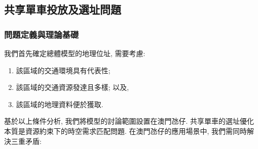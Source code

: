 \subsection{共享單車投放及選址問題}
\subsubsection{問題定義與理論基礎}
我們首先確定總體模型的地理位址, 需要考慮: 
\begin{enumerate}
    \item 該區域的交通環境具有代表性; 
    \item 該區域的交通資源發達且多樣; 以及, 
    \item 該區域的地理資料便於獲取. 
\end{enumerate}
基於以上條件分析, 我們將模型的討論範圍設置在澳門氹仔. 
共享單車的選址優化本質是資源約束下的時空需求匹配問題. 在澳門氹仔的應用場景中, 我們需同時解決三重矛盾: 


